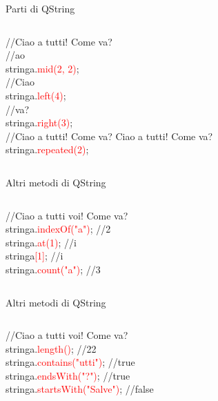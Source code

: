 \documentclass[10pt, aspectratio=169]{beamer}
\begin{document}
\begin{frame}{Parti di QString}
	\begin{columns}
		\begin{block}{}
			{\ttfamily //Ciao a tutti! Come va?\\
				\bigskip
				//ao\\
				stringa.\textcolor{red}{mid(2, 2)};\\
				\bigskip
				//Ciao\\
				stringa.\textcolor{red}{left(4)};\\
				\bigskip
				//va?\\
				stringa.\textcolor{red}{right(3)};\\
				\bigskip
				//Ciao a tutti! Come va? Ciao a tutti! Come va?\\
				stringa.\textcolor{red}{repeated(2)};}
		\end{block}
	\end{columns}
\end{frame}

\begin{frame}{Altri metodi di QString}
	\begin{columns}
		\column{0.7\textwidth}
		\begin{block}{}
			{\ttfamily //Ciao a tutti voi! Come va?\\
				\bigskip
				stringa.\textcolor{red}{indexOf("a")}; //2\\
				\bigskip
				stringa.\textcolor{red}{at(1)}; //i\\
				\bigskip
				stringa\textcolor{red}{[1]}; //i\\
				\bigskip
				stringa.\textcolor{red}{count("a")}; //3}
		\end{block}
	\end{columns}
\end{frame}

\begin{frame}{Altri metodi di QString}
	\begin{columns}
		\column{0.7\textwidth}
		\begin{block}{}
			{\ttfamily //Ciao a tutti voi! Come va?\\
				\bigskip
				stringa.\textcolor{red}{length()}; //22\\
				\bigskip
				stringa.\textcolor{red}{contains("utti")}; //true\\
				\bigskip
				stringa.\textcolor{red}{endsWith("?")}; //true\\
				\bigskip
				stringa.\textcolor{red}{startsWith("Salve")}; //false}
		\end{block}
	\end{columns}
\end{frame}
\end{document}
